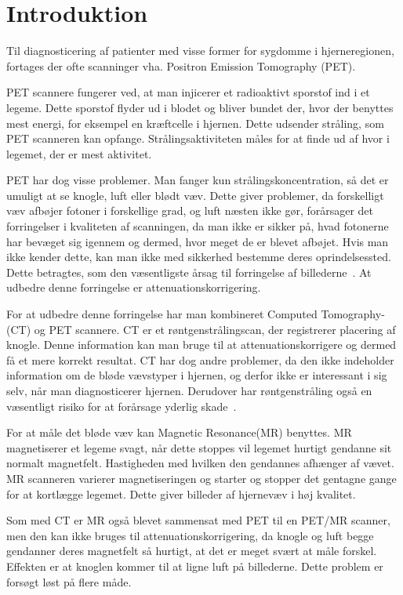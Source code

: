 \section{Introduktion}

Til diagnosticering af patienter med visse former for sygdomme i hjerneregionen, fortages der ofte scanninger vha. Positron Emission Tomography (PET). 

PET scannere fungerer ved, at man injicerer et radioaktivt sporstof
ind i et legeme. Dette sporstof flyder ud i blodet og bliver bundet
der, hvor der benyttes mest energi, for eksempel en kræftcelle i
hjernen. Dette udsender stråling, som PET scanneren kan opfange.
Strålingsaktiviteten måles for at finde ud af hvor i legemet, der er
mest aktivitet.

PET har dog visse problemer. Man fanger kun strålingskoncentration,
så det er umuligt at se knogle, luft eller blødt væv. Dette giver
problemer, da forskelligt væv afbøjer fotoner i forskellige grad,
og luft næsten ikke gør, forårsager det forringelser i kvaliteten
af scanningen, da man ikke er sikker på, hvad fotonerne har bevæget
sig igennem og dermed, hvor meget de er blevet afbøjet. Hvis man ikke
kender dette, kan man ikke med sikkerhed bestemme deres oprindelsessted.
Dette betragtes, som den væsentligste årsag til forringelse af
billederne~\cite{vigtighedAfAttenuation}. At udbedre denne forringelse er
attenuationskorrigering.

For at udbedre denne forringelse har man kombineret Computed
Tomo\-graphy- (CT) og PET scannere. CT er et røntgenstrålingscan,
der registrerer placering af knogle. Denne information kan man bruge
til at attenuationskorrigere og dermed få et mere korrekt resultat.
CT har dog andre problemer, da den ikke indeholder information om de
bløde vævstyper i hjernen, og derfor ikke er interessant i sig selv, når
man diagnosticerer hjernen. Derudover har røntgenstråling også
en væsentligt risiko for at forårsage yderlig skade~\cite{skadeligCT}.

For at måle det bløde væv kan Magnetic Resonance(MR) benyttes.
MR magnetiserer et legeme svagt, når dette stoppes vil legemet hurtigt
gendanne sit normalt magnetfelt. Hastigheden med hvilken den gendannes
afhænger af vævet. MR scanneren varierer magnetiseringen og starter og
stopper det gentagne gange for at kortlægge legemet. Dette giver billeder
af hjernevæv i høj kvalitet.

Som med CT er MR også blevet sammensat med PET til en PET/MR scanner,
men den kan ikke bruges til attenuationskorrigering, da knogle og luft
begge gendanner deres magnetfelt så hurtigt, at det er meget svært at
måle forskel. Effekten er at knoglen kommer til at ligne luft på
billederne. Dette problem er forsøgt løst på flere måde.

